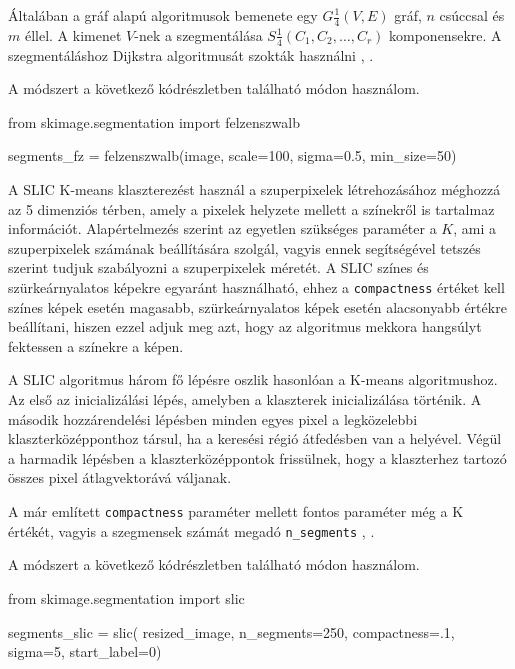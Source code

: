 Általában a gráf alapú algoritmusok bemenete egy $G \frac{1}{4} (V, E)$ gráf, $n$ csúccsal és $m$ éllel. A kimenet $V$-nek a szegmentálása $S \frac{1}{4} (C_1, C_2, \dots, C_r)$ komponensekre. A szegmentáláshoz Dijkstra algoritmusát szokták használni \cite{superpixel}, \cite{superpixel_example}.

A módszert a következő kódrészletben található módon használom.
\begin{python}
from skimage.segmentation import felzenszwalb

segments_fz = felzenszwalb(image, scale=100, sigma=0.5, min_size=50)
\end{python}


A SLIC K-means klaszterezést használ a szuperpixelek létrehozásához méghozzá az 5 dimenziós térben, amely a pixelek helyzete mellett a színekről is tartalmaz információt. Alapértelmezés szerint az egyetlen szükséges paraméter a $K$, ami a szuperpixelek számának beállítására szolgál, vagyis ennek segítségével tetszés szerint tudjuk szabályozni a szuperpixelek méretét. A SLIC színes és szürkeárnyalatos képekre egyaránt használható, ehhez a \texttt{compactness} értéket kell színes képek esetén magasabb, szürkeárnyalatos képek esetén alacsonyabb értékre beállítani, hiszen ezzel adjuk meg azt, hogy az algoritmus mekkora hangsúlyt fektessen a színekre a képen.

A SLIC algoritmus három fő lépésre oszlik hasonlóan a K-means algoritmushoz. Az első az inicializálási lépés, amelyben a klaszterek inicializálása történik. A második hozzárendelési lépésben minden egyes pixel a legközelebbi klaszterközépponthoz társul, ha a keresési régió átfedésben van a helyével. Végül a harmadik lépésben a klaszterközéppontok frissülnek, hogy a klaszterhez tartozó összes pixel átlagvektorává váljanak.

A már említett \texttt{compactness} paraméter mellett fontos paraméter még a K értékét, vagyis a szegmensek számát megadó \texttt{n\_segments} \cite{superpixel}, \cite{superpixel_example}.

A módszert a következő kódrészletben található módon használom.
\begin{python}
from skimage.segmentation import slic

segments_slic = slic(
    resized_image,
    n_segments=250,
    compactness=.1,
    sigma=5,
    start_label=0)
\end{python}


